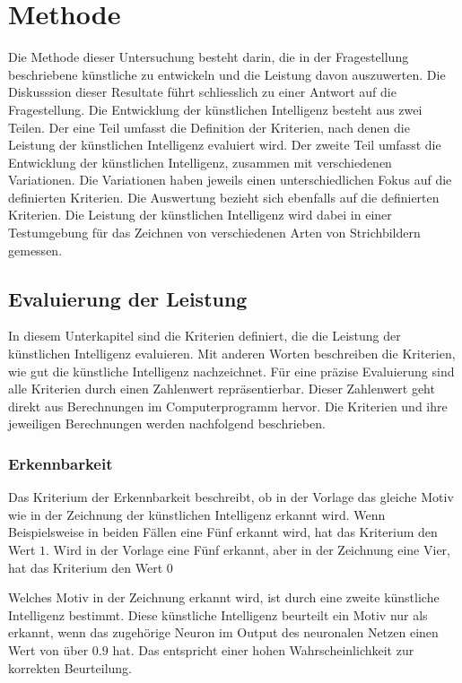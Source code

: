 \chapter{Methode}
Die Methode dieser Untersuchung besteht darin, die in der Fragestellung
beschriebene künstliche zu entwickeln und die Leistung davon auszuwerten. Die
Diskusssion dieser Resultate führt schliesslich zu einer Antwort auf die
Fragestellung. 
Die Entwicklung der künstlichen Intelligenz besteht aus zwei Teilen. Der eine
Teil umfasst die Definition der Kriterien, nach denen die Leistung der
künstlichen Intelligenz evaluiert wird. Der zweite Teil umfasst die Entwicklung
der künstlichen Intelligenz, zusammen mit verschiedenen Variationen. Die
Variationen haben jeweils einen unterschiedlichen Fokus auf die definierten
Kriterien. Die Auswertung bezieht sich ebenfalls auf die definierten Kriterien.
Die Leistung der künstlichen Intelligenz wird dabei in einer Testumgebung für
das Zeichnen von verschiedenen Arten von Strichbildern gemessen.



\section{Evaluierung der Leistung}
In diesem Unterkapitel sind die Kriterien definiert, die die Leistung der
künstlichen Intelligenz evaluieren. Mit anderen Worten beschreiben die
Kriterien, wie gut die künstliche Intelligenz nachzeichnet. Für eine präzise
Evaluierung sind alle Kriterien durch einen Zahlenwert repräsentierbar. Dieser
Zahlenwert geht direkt aus Berechnungen im Computerprogramm hervor. Die
Kriterien und ihre jeweiligen Berechnungen werden nachfolgend beschrieben.

\subsection{Erkennbarkeit}
Das Kriterium der Erkennbarkeit beschreibt, ob in der Vorlage das gleiche Motiv
wie in der Zeichnung der künstlichen Intelligenz erkannt wird. Wenn
Beispielsweise in beiden Fällen eine Fünf erkannt wird, hat das Kriterium den
Wert $1$. Wird in der Vorlage eine Fünf erkannt, aber in der Zeichnung eine
Vier, hat das Kriterium den Wert $0$

Welches Motiv in der Zeichnung erkannt wird, ist durch eine zweite künstliche
Intelligenz bestimmt. Diese künstliche Intelligenz beurteilt ein Motiv nur als
erkannt, wenn das zugehörige Neuron im Output des neuronalen Netzen einen Wert
von über $0.9$ hat. Das entspricht einer hohen Wahrscheinlichkeit zur korrekten
Beurteilung.

